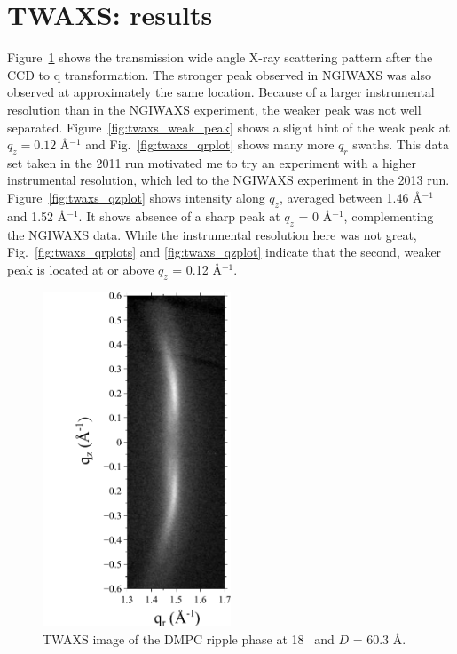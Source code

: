 \newpage
\section{TWAXS: results}\label{sec:TWAXS_results}
Figure~\ref{fig:twaxs_ripple} shows the transmission wide angle X-ray
scattering pattern after the CCD to q transformation. The stronger
peak observed in NGIWAXS was also observed at approximately the same location.
Because of a larger instrumental resolution than in the NGIWAXS experiment,
the weaker peak was not well separated. Figure~\ref{fig:twaxs_weak_peak} shows
a slight hint of the weak peak at $q_z=0.12$ \AA$^{-1}$ and 
Fig.~\ref{fig:twaxs_qrplot} shows many more $q_r$ swaths. This
data set taken in the 2011 run motivated me to try an experiment
with a higher instrumental resolution, which led to the NGIWAXS experiment
in the 2013 run. Figure~\ref{fig:twaxs_qzplot} shows intensity along $q_z$,
averaged between 1.46 \AA$^{-1}$ and 1.52 \AA$^{-1}$. It shows absence of
a sharp peak at $q_z$ = 0 \AA$^{-1}$, complementing the NGIWAXS data.
While the instrumental resolution here was not great, 
Fig.~\ref{fig:twaxs_qrplots} and \ref{fig:twaxs_qzplot} indicate
that the second, weaker peak is located at or above $q_z$ = 0.12 \AA$^{-1}$.

\begin{figure}
  \centering
  \includegraphics[trim=20 0 10 0,clip,width=0.5\textwidth]{figures/ripple/TWAXS/twaxs_ripple}
  \caption[TWAXS image of the DMPC ripple phase]{TWAXS image of the DMPC
  ripple phase at 18 \textcelsius\ and $D$ = 60.3 \AA.}
  \label{fig:twaxs_ripple}
\end{figure}

